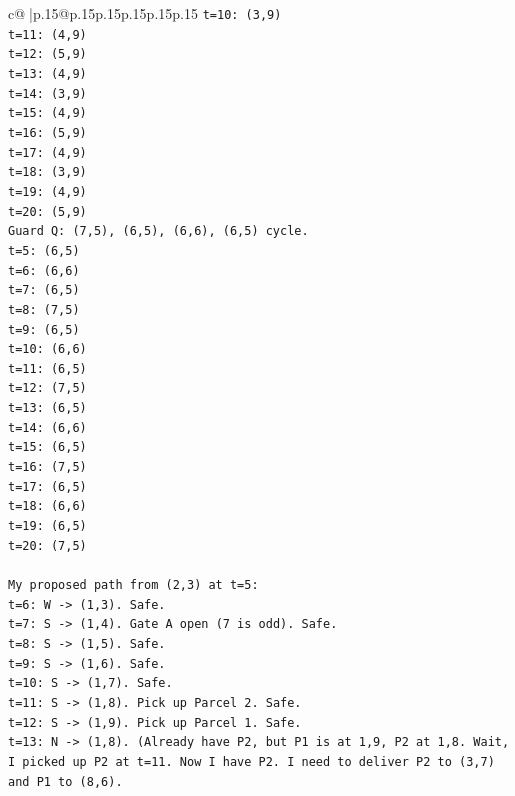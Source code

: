 \documentclass{article}
\begin{document}
{\begin{supertabular}{c@{$\;$}|p{.15\linewidth}@{}p{.15\linewidth}p{.15\linewidth}p{.15\linewidth}p{.15\linewidth}p{.15\linewidth}}
{{{\texttt{t=10: (3,9)} \\
\texttt{t=11: (4,9)} \\
\texttt{t=12: (5,9)} \\
\texttt{t=13: (4,9)} \\
\texttt{t=14: (3,9)} \\
\texttt{t=15: (4,9)} \\
\texttt{t=16: (5,9)} \\
\texttt{t=17: (4,9)} \\
\texttt{t=18: (3,9)} \\
\texttt{t=19: (4,9)} \\
\texttt{t=20: (5,9)} \\
\texttt{Guard Q: (7,5), (6,5), (6,6), (6,5) cycle.} \\
\texttt{t=5: (6,5)} \\
\texttt{t=6: (6,6)} \\
\texttt{t=7: (6,5)} \\
\texttt{t=8: (7,5)} \\
\texttt{t=9: (6,5)} \\
\texttt{t=10: (6,6)} \\
\texttt{t=11: (6,5)} \\
\texttt{t=12: (7,5)} \\
\texttt{t=13: (6,5)} \\
\texttt{t=14: (6,6)} \\
\texttt{t=15: (6,5)} \\
\texttt{t=16: (7,5)} \\
\texttt{t=17: (6,5)} \\
\texttt{t=18: (6,6)} \\
\texttt{t=19: (6,5)} \\
\texttt{t=20: (7,5)} \\
\\ 
\texttt{My proposed path from (2,3) at t=5:} \\
\texttt{t=6: W {-}> (1,3). Safe.} \\
\texttt{t=7: S {-}> (1,4). Gate A open (7 is odd). Safe.} \\
\texttt{t=8: S {-}> (1,5). Safe.} \\
\texttt{t=9: S {-}> (1,6). Safe.} \\
\texttt{t=10: S {-}> (1,7). Safe.} \\
\texttt{t=11: S {-}> (1,8). Pick up Parcel 2. Safe.} \\
\texttt{t=12: S {-}> (1,9). Pick up Parcel 1. Safe.} \\
\texttt{t=13: N {-}> (1,8). (Already have P2, but P1 is at 1,9, P2 at 1,8. Wait, I picked up P2 at t=11. Now I have P2. I need to deliver P2 to (3,7) and P1 to (8,6).} \\
}}}
\end{supertabular}}
\end{document}
